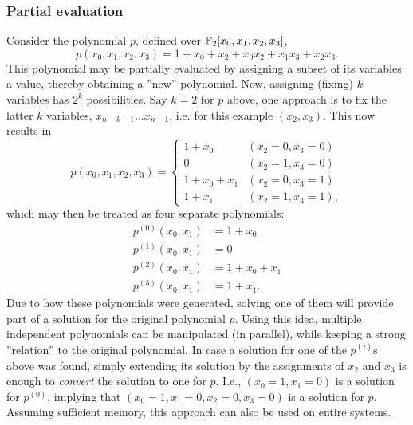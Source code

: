 \subsubsection{Partial evaluation} \label{sec:prereq:partial_eval}
Consider the polynomial $p$, defined over $\mathbb{F}_2[x_0,x_1,x_2,x_3]$,
$$
    p(x_0, x_1, x_2, x_3) = 1 + x_0 + x_2 + x_0x_2 + x_1x_3 + x_2x_3.
$$
This polynomial may be partially evaluated by assigning a subset of its variables a value, thereby obtaining a ''new'' polynomial. Now, assigning (fixing) $k$ variables has $2^k$ possibilities. Say $k = 2$ for $p$ above, one approach is to fix the latter $k$ variables, $x_{n - k - 1} \dots x_{n - 1}$, i.e. for this example $(x_2,x_3)$. This now results in 
\begin{equation}
    p(x_0,x_1,x_2,x_3) = 
    \begin{cases}
        1 + x_0       & (x_2 = 0, x_3 = 0)\\
        0             & (x_2 = 1, x_3 = 0)\\
        1 + x_0 + x_1 & (x_2 = 0, x_3 = 1)\\
        1 + x_1       & (x_2 = 1, x_3 = 1),
    \end{cases}
\end{equation} 
which may then be treated as four separate polynomials:
\begin{equation*}
    \begin{split}
        p^{(0)}(x_0, x_1) &= 1 + x_0          \\
        p^{(1)}(x_0, x_1) &= 0                \\           
        p^{(2)}(x_0, x_1) &= 1 + x_0 + x_1    \\
        p^{(3)}(x_0, x_1) &= 1 + x_1.
    \end{split}
\end{equation*}
Due to how these polynomials were generated, solving one of them will provide part of a solution for the original polynomial $p$. Using this idea, multiple independent polynomials can be manipulated (in parallel), while keeping a strong ''relation'' to the original polynomial. In case a solution for one of the $p^{(i)}$s above was found, simply extending its solution by the assignments of $x_2$ and $x_3$ is enough to \textit{convert} the solution to one for $p$. I.e., $(x_0 = 1, x_1 = 0)$ is a solution for $p^{(0)}$, implying that $(x_0 = 1, x_1 = 0, x_2 = 0, x_3 = 0)$ is a solution for $p$. Assuming sufficient memory, this approach can also be used on entire systems.

